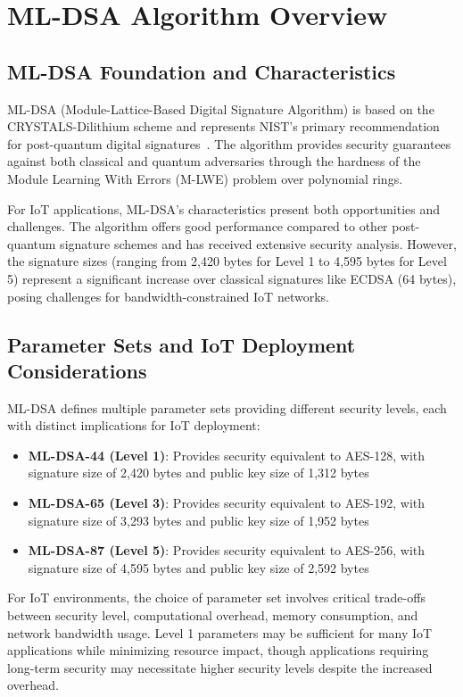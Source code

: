 \documentclass[journal=tches,final]{iacrtrans}
\begin{document}
\section{ML-DSA Algorithm Overview}

\subsection{ML-DSA Foundation and Characteristics}

ML-DSA (Module-Lattice-Based Digital Signature Algorithm) is based on the CRYSTALS-Dilithium scheme and represents NIST's primary recommendation for post-quantum digital signatures~\cite{FIPS204}. The algorithm provides security guarantees against both classical and quantum adversaries through the hardness of the Module Learning With Errors (M-LWE) problem over polynomial rings.

For IoT applications, ML-DSA's characteristics present both opportunities and challenges. The algorithm offers good performance compared to other post-quantum signature schemes and has received extensive security analysis. However, the signature sizes (ranging from 2,420 bytes for Level 1 to 4,595 bytes for Level 5) represent a significant increase over classical signatures like ECDSA (64 bytes), posing challenges for bandwidth-constrained IoT networks.

\subsection{Parameter Sets and IoT Deployment Considerations}

ML-DSA defines multiple parameter sets providing different security levels, each with distinct implications for IoT deployment:

\begin{itemize}
    \item \textbf{ML-DSA-44 (Level 1)}: Provides security equivalent to AES-128, with signature size of 2,420 bytes and public key size of 1,312 bytes
    \item \textbf{ML-DSA-65 (Level 3)}: Provides security equivalent to AES-192, with signature size of 3,293 bytes and public key size of 1,952 bytes
    \item \textbf{ML-DSA-87 (Level 5)}: Provides security equivalent to AES-256, with signature size of 4,595 bytes and public key size of 2,592 bytes
\end{itemize}

For IoT environments, the choice of parameter set involves critical trade-offs between security level, computational overhead, memory consumption, and network bandwidth usage. Level 1 parameters may be sufficient for many IoT applications while minimizing resource impact, though applications requiring long-term security may necessitate higher security levels despite the increased overhead.
\end{document}
